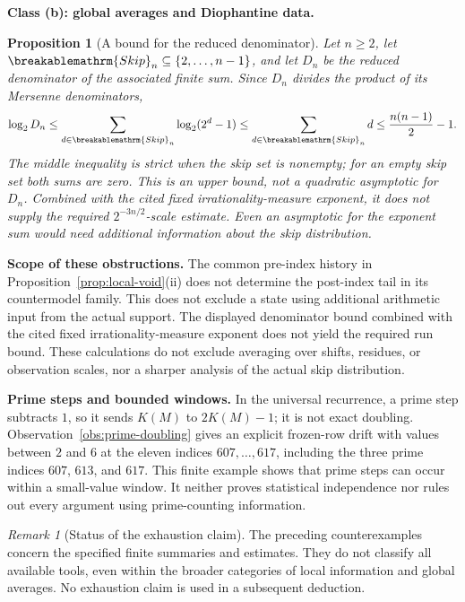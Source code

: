 \documentclass[11pt]{article}
\theoremstyle{plain}
\newtheorem{prop}[thm]{Proposition}
\theoremstyle{definition}
\theoremstyle{remark}
\newtheorem{rem}[thm]{Remark}
\renewcommand{\mathrm}[1]{\ifmmode\breakablemathrm{#1}\else\textrm{#1}\fi}%
\begin{document}
\textbf{Class (b): global averages and Diophantine data.}

\begin{prop}[A bound for the reduced denominator]
\label{prop:exponent-gap}
Let $n\ge2$, let $\mathrm{Skip}_n\subseteq\{2,\ldots,n-1\}$,
and let $D_n$ be the reduced denominator of the associated finite sum.
Since $D_n$ divides the product of its Mersenne denominators,
\[
 \log_2D_n\le\sum_{d\in\mathrm{Skip}_n}\log_2(2^d-1)
 \le\sum_{d\in\mathrm{Skip}_n}d\le\frac{n(n-1)}2-1.
\]
The middle inequality is strict when the skip set is nonempty; for an
empty skip set both sums are zero.  This is an upper bound, not a
quadratic asymptotic for $D_n$.  Combined with the cited fixed
irrationality-measure exponent, it does not supply the required
$2^{-3n/2}$-scale estimate.  Even an asymptotic for the exponent sum would
need additional information about the skip distribution.
\end{prop}

\textbf{Scope of these obstructions.} The common pre-index history in
Proposition~\ref{prop:local-void}(ii) does not determine the post-index
tail in its countermodel family.  This does not exclude a state using
additional arithmetic input from the actual support.  The displayed
denominator bound combined with the cited fixed irrationality-measure
exponent does not yield the required run bound. These calculations do not
exclude averaging over shifts, residues, or observation scales, nor a sharper analysis of the
actual skip distribution.

\textbf{Prime steps and bounded windows.} In the universal recurrence,
a prime step subtracts $1$, so it sends $K(M)$ to $2K(M)-1$; it is
not exact doubling.  Observation~\ref{obs:prime-doubling} gives an
explicit frozen-row drift with values between $2$ and $6$ at the eleven
indices $607,\ldots,617$, including the three prime indices $607$, $613$,
and $617$.  This finite example shows that prime steps can occur within
a small-value window.  It neither proves statistical independence nor
rules out every argument using prime-counting information.

\begin{rem}[Status of the exhaustion claim]
The preceding counterexamples concern the specified finite summaries and
estimates.  They do not classify all available tools, even within the
broader categories of local information and global averages.  No exhaustion
claim is used in a subsequent deduction.
\end{rem}
\end{document}
